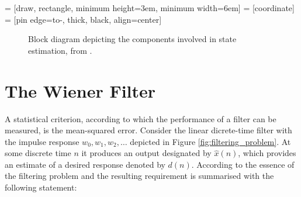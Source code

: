  = [draw, rectangle, minimum height=3em, minimum width=6em]
 = [coordinate]
 = [pin edge={to-, thick, black}, align=center]

\begin{figure}
\centering
{}
\caption{Block diagram depicting the components involved in state estimation, from \cite{haykin2002adaptive}.} \label{fig:state_estimation}
\end{figure}

\section{The Wiener Filter}

A statistical criterion, according to which the performance of a filter can be measured, is the mean-squared error. Consider the linear dicrete-time filter with the impulse response $w_0, w_1, w_2, \dots$ depicted in Figure \ref{fig:filtering_problem}. At some discrete time $n$ it produces an output designated by $\hat{x}(n)$, which provides an estimate of a desired response denoted by $d(n)$. According to \citeauthor{haykin2002adaptive} \cite{haykin2002adaptive} the essence of the filtering problem and the resulting requirement is summarised with the following statement:

